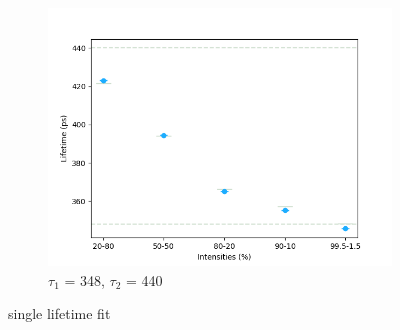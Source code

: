 \begin{figure}[p]
{        \begin{subfigure}{0.7\textwidth}
            \centering
            \includegraphics[width=0.95\linewidth]{Batch 7/348-440/output/1 life/lifetime.png}
            \caption{$\tau_1$ = 348, $\tau_2$ = 440}
            \label{fig:1life_348}
        \end{subfigure}
    }
    \label{fig:1life}
    \caption{single lifetime fit} 
\end{figure}

